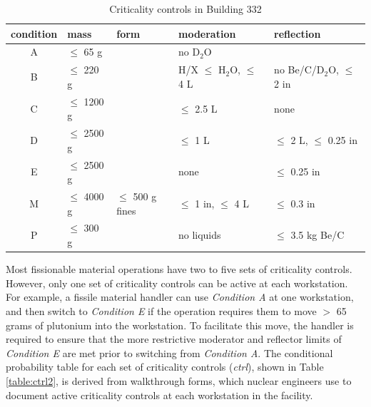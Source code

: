 \begin{table}
  \caption{Criticality controls in Building 332}
  \label{table:ctrl1}
  \renewcommand\arraystretch{1.5}
  \begin{center}
    \begin{tabular}{|c l l l l|}
      \hline
      condition & mass          & form               & moderation                      & reflection \\
      \hline
      A         & $\leq$ 65 g   &                    & no D$_{2}$O                     & \\
      B         & $\leq$ 220 g  &                    & H/X $\leq$ H$_{2}$O, $\leq$ 4 L & no Be/C/D$_{2}$O, $\leq$ 2 in \\
      C         & $\leq$ 1200 g &                    & $\leq$ 2.5 L                    & none \\
      D         & $\leq$ 2500 g &                    & $\leq$ 1 L                      & $\leq$ 2 L, $\leq$ 0.25 in \\
      E         & $\leq$ 2500 g &                    & none                            & $\leq$ 0.25 in \\
      M         & $\leq$ 4000 g & $\leq$ 500 g fines & $\leq$ 1 in, $\leq$ 4 L         & $\leq$ 0.3 in \\
      P         & $\leq$ 300 g  &                    & no liquids                      & $\leq$ 3.5 kg Be/C \\
      \hline
    \end{tabular}
  \end{center}
\end{table}

Most fissionable material operations have two to five sets of criticality controls.
However, only one set of criticality controls can be active at each workstation.
For example, a fissile material handler can use \textit{Condition A} at one workstation, and then switch to \textit{Condition E} if the operation requires them to move $>$ 65 grams of plutonium into the workstation.
To facilitate this move, the handler is required to ensure that the more restrictive moderator and reflector limits of \textit{Condition E} are met prior to switching from \textit{Condition A}.
The conditional probability table for each set of criticality controls (\textit{ctrl}), shown in Table \ref{table:ctrl2}, is derived from walkthrough forms, which nuclear engineers use to document active criticality controls at each workstation in the facility.

